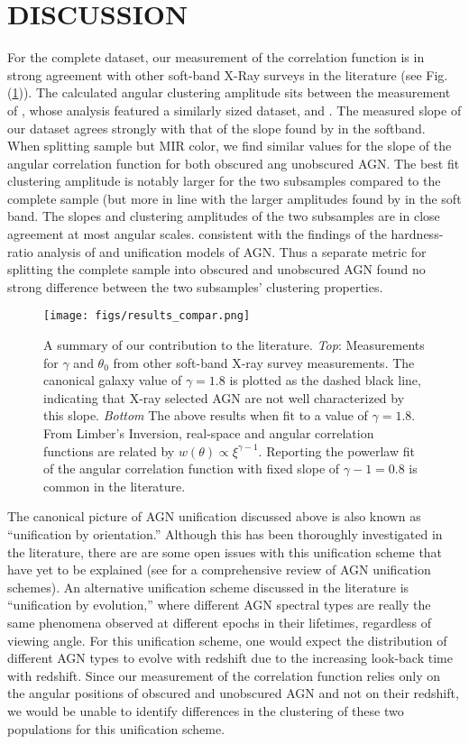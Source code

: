 \documentclass[preprint]{aastex63}
\begin{document}
\section{DISCUSSION}
For the complete dataset, our measurement of the correlation function is in strong agreement
with other soft-band X-Ray surveys in the literature (see Fig. (\ref{fig:comp})). The calculated angular clustering amplitude 
sits between the measurement of \cite{ebrero}, whose analysis featured a similarly sized dataset, and \cite{elyiv}. The 
measured slope of our dataset agrees strongly with that of the slope found by \cite{ebrero} in the softband. When splitting sample but MIR color, we find similar values for the slope 
of the angular correlation function for both obscured ang unobscured AGN. The best fit clustering amplitude is notably larger for the two subsamples compared to the complete sample 
(but more in line with the larger amplitudes found by \citet{ebrero} in the soft band. The slopes and clustering amplitudes of the two subsamples are in close agreement at most angular scales.
consistent with the findings of the hardness-ratio analysis of  \cite{ebrero} and unification models of AGN.
Thus a separate metric for splitting the complete sample into obscured and unobscured AGN found no strong difference
between the two subsamples' clustering properties.

\begin{figure}[!ht]
    \centering
    \texttt{[image: figs/results\_compar.png]}
    \label{fig:comp}
    \caption{A summary of our contribution to the literature. \textit{Top}: Measurements for $\gamma$ and $\theta_0$
    from other soft-band X-ray survey measurements. The canonical galaxy value of  $\gamma = 1.8$ is plotted as the dashed black line,
    indicating that X-ray selected AGN are not well characterized by this slope. \textit{Bottom} The above results when fit to a value of 
    $\gamma = 1.8$. From Limber's Inversion, real-space and angular correlation functions are related by $w(\theta) \propto \xi^{\gamma - 1}$. 
    Reporting the powerlaw fit of the angular correlation function with fixed slope of $\gamma - 1 = 0.8$ is common 
    in the literature. 
    }
\end{figure}

The canonical picture of AGN unification discussed above is also known as ``unification by orientation.''  Although this has been thoroughly investigated
in the literature, there are are some open issues with this unification scheme that have yet to be explained (see \citet{netzer:2015} for a comprehensive review 
of AGN unification schemes). An alternative unification scheme discussed in the literature is ``unification by evolution,'' where different AGN 
spectral types are really the same phenomena observed at different epochs in their lifetimes, regardless of viewing angle. For this unification scheme, one would 
expect the distribution of different AGN types to evolve with redshift due to the increasing look-back time with redshift. 
Since our measurement of the correlation function relies only
on the angular positions of obscured and unobscured AGN and not on their redshift, we would be unable to identify differences 
in the clustering of these two populations for this unification scheme. 
\end{document}
